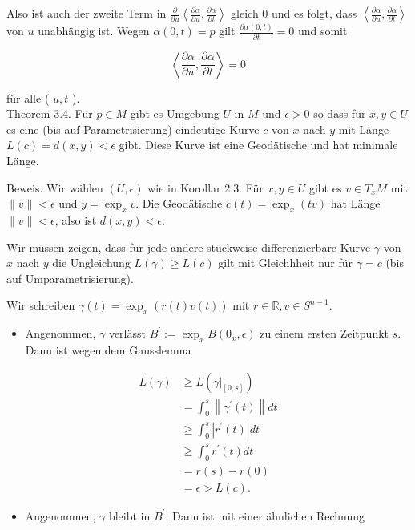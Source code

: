 \documentclass[10pt, letterpaper]{article}
\begin{document}
Also ist auch der zweite Term in $\frac{\partial}{\partial u}\left\langle\frac{\partial \alpha}{\partial u}, \frac{\partial \alpha}{\partial t}\right\rangle$ gleich 0 und es folgt, dass $\left\langle\frac{\partial \alpha}{\partial u}, \frac{\partial \alpha}{\partial t}\right\rangle$ von $u$ unabhängig ist. Wegen $\alpha(0, t)=p$ gilt $\frac{\partial \alpha(0, t)}{\partial t}=0$ und somit

$$
\left\langle\frac{\partial \alpha}{\partial u}, \frac{\partial \alpha}{\partial t}\right\rangle=0
$$

für alle ( $u, t$ ).\\
Theorem 3.4. Für $p \in M$ gibt es Umgebung $U$ in $M$ und $\epsilon>0$ so dass für $x, y \in U$ es eine (bis auf Parametrisierung) eindeutige Kurve $c$ von $x$ nach $y$ mit Länge $L(c)=d(x, y)<\epsilon$ gibt. Diese Kurve ist eine Geodätische und hat minimale Länge.

Beweis. Wir wählen $(U, \epsilon)$ wie in Korollar 2.3. Für $x, y \in U$ gibt es $v \in T_{x} M$ mit $\|v\|<\epsilon$ und $y=\exp _{x} v$. Die Geodätische $c(t)=\exp _{x}(t v)$ hat Länge $\|v\|<\epsilon$, also ist $d(x, y)<\epsilon$.

Wir müssen zeigen, dass für jede andere stückweise differenzierbare Kurve $\gamma$ von $x$ nach $y$ die Ungleichung $L(\gamma) \geq L(c)$ gilt mit Gleichhheit nur für $\gamma=c$ (bis auf Umparametrisierung).

Wir schreiben $\gamma(t)=\exp _{x}(r(t) v(t))$ mit $r \in \mathbb{R}, v \in S^{n-1}$.

\begin{itemize}
  \item Angenommen, $\gamma$ verlässt $B^{\prime}:=\exp _{x} B\left(0_{x}, \epsilon\right)$ zu einem ersten Zeitpunkt $s$. Dann ist wegen dem Gausslemma
\end{itemize}

$$
\begin{aligned}
L(\gamma) & \geq L\left(\left.\gamma\right|_{[0, s]}\right) \\
& =\int_{0}^{s}\left\|\gamma^{\prime}(t)\right\| d t \\
& \geq \int_{0}^{s}\left|r^{\prime}(t)\right| d t \\
& \geq \int_{0}^{s} r^{\prime}(t) d t \\
& =r(s)-r(0) \\
& =\epsilon>L(c) .
\end{aligned}
$$

\begin{itemize}
  \item Angenommen, $\gamma$ bleibt in $B^{\prime}$. Dann ist mit einer ähnlichen Rechnung
\end{itemize}
\end{document}
